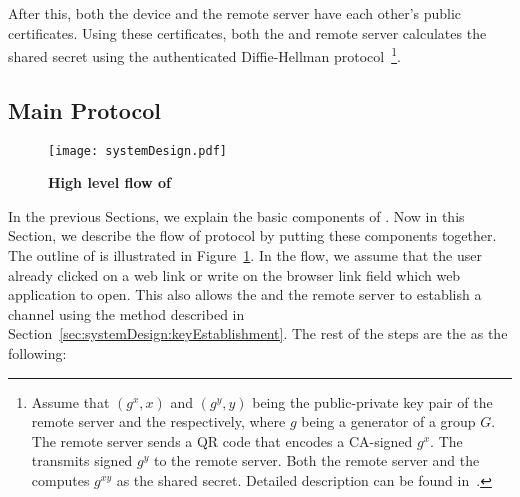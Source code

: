 After this, both the device and the remote server have each other's public certificates. Using these certificates, both the \device and remote server calculates the shared secret using the authenticated Diffie-Hellman protocol~\footnote{Assume that $(g^x, x)$ and $(g^y, y)$ being the public-private key pair of the remote server and the \device respectively, where $g$ being a generator of a group $G$. The remote server sends a QR code that encodes a CA-signed $g^x$. The \device transmits signed $g^y$ to the remote server. Both the remote server and the \device computes $g^{xy}$ as the shared secret. Detailed description can be found  in~\cite{blake1998authenticated}.}.




\subsection{Main Protocol}
\label{sec:systemDesign:mainProtocol}

\begin{figure}[t]
\centering
\texttt{[image: systemDesign.pdf]}
\caption{\textbf{High level flow of \name}}
\label{fig:systemDesign}
\centering
\end{figure}


In the previous Sections, we explain the basic components of \name. Now in this Section, we describe the flow of \name protocol by putting these components together. The outline of \name is illustrated in Figure~\ref{fig:systemDesign}. In the flow, we assume that the user already clicked on a web link or write on the browser link field which web application to open. This also allows the \device and the remote server to establish a \tls channel using the method described in Section~\ref{sec:systemDesign:keyEstablishment}. The rest of the steps are the as the following:


